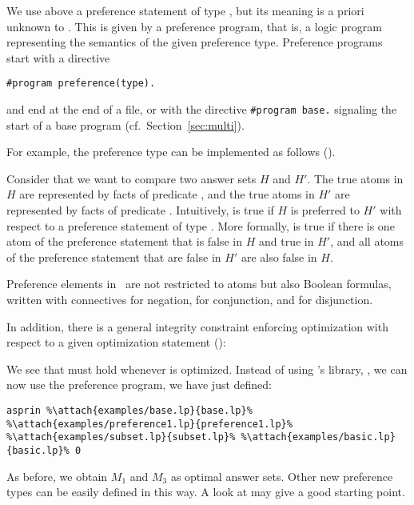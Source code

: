 We use above a preference statement of type , 
but its meaning is a priori unknown to \asprin.
This is given by a preference program, that is, a logic program representing the semantics of the given preference type. 
Preference programs start with a directive
\begin{lstlisting}[numbers=none]
#program preference(type).
\end{lstlisting}
and end at the end of a file, or with the directive
\lstinline{#program base.}
signaling the start of a base program (cf.~Section~\ref{sec:multi}). 

For example, the preference type  can be implemented as follows
().
%

%
Consider that we want to compare two answer sets $H$ and $H'$. 
The true atoms in $H$ are represented by facts of predicate ,  and the true atoms in $H'$ are represented by facts of predicate . 
Intuitively,  is true if $H$ is preferred to $H'$ with respect to a preference statement  of type . 
More formally, 
 is true if there is one atom  of the preference statement that is false in $H$ and true in $H'$, 
and all atoms  of the preference statement that are false in $H'$ are also false in $H$.  

\begin{note}
Preference elements in \asprin\ are not restricted to atoms 
but also Boolean formulas, written with connectives 
\code{\~} for negation, 
\code{\&} for conjunction,
and 
\code{|} for disjunction.
\end{note}

In addition, 
there is a general integrity constraint enforcing optimization with respect to a given optimization statement
():
%

%
We see that  must hold whenever  is optimized. 
Instead of using \asprin's library, , 
we can now use the preference program, we have just defined:
\begin{lstlisting}[numbers=none,escapechar=\%]
asprin %\attach{examples/base.lp}{base.lp}% %\attach{examples/preference1.lp}{preference1.lp}% %\attach{examples/subset.lp}{subset.lp}% %\attach{examples/basic.lp}{basic.lp}% 0
\end{lstlisting}
As before, we obtain $M_1$ and $M_3$ as optimal answer sets.
Other new preference types can be easily defined in this way.  
A look at  may give a good starting point. 


